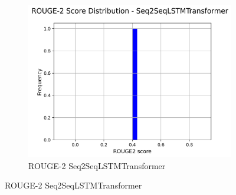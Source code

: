 \begin{figure}[H]
    \hfill
    \begin{subfigure}{0.24\textwidth}
        \centering
        \includegraphics[width=\textwidth]{media/Seq2SeqLSTMTransformer_rouge2_scores.png}
        \caption{ROUGE-2 Seq2SeqLSTMTransformer}
    \end{subfigure}


\end{figure}

